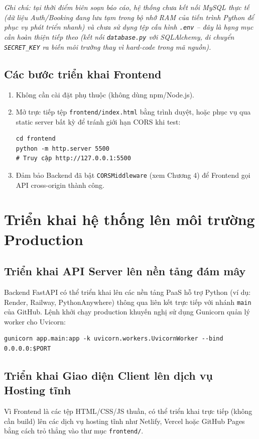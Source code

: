 \textit{Ghi chú: tại thời điểm biên soạn báo cáo, hệ thống chưa kết nối MySQL thực tế (dữ liệu Auth/Booking đang lưu tạm trong bộ nhớ RAM của tiến trình Python để phục vụ phát triển nhanh) và chưa sử dụng tệp cấu hình \texttt{.env} -- đây là hạng mục cần hoàn thiện tiếp theo (kết nối \texttt{database.py} với SQLAlchemy, di chuyển \texttt{SECRET\_KEY} ra biến môi trường thay vì hard-code trong mã nguồn).}

\subsection{Các bước triển khai Frontend}
\begin{enumerate}
    \item Không cần cài đặt phụ thuộc (không dùng npm/Node.js).
    \item Mở trực tiếp tệp \texttt{frontend/index.html} bằng trình duyệt, hoặc phục vụ qua static server bất kỳ để tránh giới hạn CORS khi test:
\begin{verbatim}
cd frontend
python -m http.server 5500
# Truy cập http://127.0.0.1:5500
\end{verbatim}
    \item Đảm bảo Backend đã bật \texttt{CORSMiddleware} (xem Chương 4) để Frontend gọi API cross-origin thành công.
\end{enumerate}

\section{Triển khai hệ thống lên môi trường Production}

\subsection{Triển khai API Server lên nền tảng đám mây}
Backend FastAPI có thể triển khai lên các nền tảng PaaS hỗ trợ Python (ví dụ: Render, Railway, PythonAnywhere) thông qua liên kết trực tiếp với nhánh \texttt{main} của GitHub. Lệnh khởi chạy production khuyến nghị sử dụng Gunicorn quản lý worker cho Uvicorn:
\begin{verbatim}
gunicorn app.main:app -k uvicorn.workers.UvicornWorker --bind 0.0.0.0:$PORT
\end{verbatim}

\subsection{Triển khai Giao diện Client lên dịch vụ Hosting tĩnh}
Vì Frontend là các tệp HTML/CSS/JS thuần, có thể triển khai trực tiếp (không cần build) lên các dịch vụ hosting tĩnh như Netlify, Vercel hoặc GitHub Pages bằng cách trỏ thẳng vào thư mục \texttt{frontend/}.

